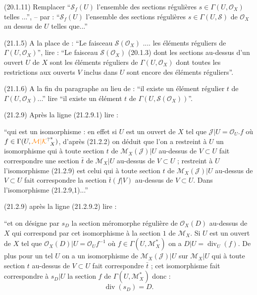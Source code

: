 (20.1.11) Remplacer ``$\mathscr S_f(U)$ l'ensemble des sections régulières $s\in\Gamma(U,\mathcal O_X)$ telles ...'', -- par : ``$\mathscr S_f(U)$ l'ensemble des sections régulières $s\in\Gamma(U,\mathscr S)$  de $\mathcal O_X$ au dessus de $U$ telles que...''


(21.1.5) A la place de : ``Le faisceau $\mathscr S(\mathcal O_X)$ .... les éléments réguliers de $\Gamma(U,\mathcal O_X)$'', lire : ``Le faisceau $\mathscr S(\mathcal O_X)$ (20.1.3) dont les sections au-dessus d'un ouvert $U$ de $X$ sont les éléments réguliers de $\Gamma(U,\mathcal O_X)$ dont toutes les restrictions aux ouverts $V$ inclus dans $U$ sont encore des éléments réguliers''.

(21.1.6) A la fin du paragraphe au lieu de : ``il existe un élément régulier $t$ de $\Gamma(U,\mathcal O_X)$...'' lire ``il existe un élément  $t$ de $\Gamma(U,\mathscr S(\mathcal O_X))$''.

(21.2.9) Après la ligne (21.2.9.1) lire :

``qui est un isomorphisme : en effet si $U$ est un ouvert de $X$ tel que $\mathcal J|U=\mathcal O_U.f$ où $f\in\Gamma(U,{\unsure{\mathcal M|\mathcal K}}_X^*)$, d'après (21.2.2) on déduit que l'on a  restreint à $U$ un isomorphisme  qui à toute section $t$ de $\mathcal M_X(\mathcal J)|U$ au-dessus de $V\subset U$ fait correspondre une section $\bar t$ de $\mathcal M_X|U$ au-dessus de $V\subset U$ ; restreint à $U$ l'isomorphisme (21.2.9) est celui qui à toute section $t$ de $\mathcal M_X(\mathcal J)|U$ au-dessus de $V\subset U$ fait correspondre la section $\bar t(f|V)$ au-dessus de $V\subset U$. Dans l'isomorphisme (21.2.9,1)...''

(21.2.9) après la ligne (21.2.9.2) lire :

``et on désigne par $s_D$ la section méromorphe régulière de $\mathcal O_X(D)$ au-dessus de $X$ qui correspond par cet isomorphisme à la section $1$ de $\mathcal M_X$. Si $U$ est un ouvert de $X$ tel que $\mathcal O_X(D)|U=\mathcal O_U f^{-1}$ où $f\in\Gamma(U,\mathcal M_X^*)$  on a $D|U=\operatorname{div}_U(f)$. De plus pour un tel $U$ on a un isomorphisme de $\mathcal M_X(\mathcal J)|U$ sur $\mathcal M_X|U$ qui à toute section $t$ au-dessus de $V\subset U$ fait correspondre $\bar t$ ; cet isomorphisme fait correspondre à $s_D|U$ la section $f$ de $\Gamma(U,\mathcal M_X^*)$ donc :
\[
\operatorname{div}(s_D)=D.\tag*{(21,2.9.3)}
\]

